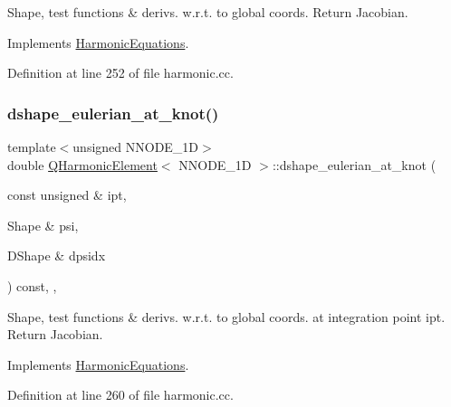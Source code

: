 Shape, test functions \& derivs. w.\+r.\+t. to global coords. Return Jacobian. 



Implements \hyperlink{classHarmonicEquations_ae013637e60841f46cf4c452ee3469163}{Harmonic\+Equations}.



Definition at line 252 of file harmonic.\+cc.

\mbox{\label{classQHarmonicElement_a6b11b5a42bd20c4e1d1e9840ba22a80a}} 
\subsubsection{\texorpdfstring{dshape\+\_\+eulerian\+\_\+at\+\_\+knot()}{dshape\_eulerian\_at\_knot()}}
{\footnotesize\ttfamily template$<$unsigned N\+N\+O\+D\+E\+\_\+1D$>$ \\
double \hyperlink{classQHarmonicElement}{Q\+Harmonic\+Element}$<$ N\+N\+O\+D\+E\+\_\+1D $>$\+::dshape\+\_\+eulerian\+\_\+at\+\_\+knot (\begin{DoxyParamCaption}\item[{const unsigned \&}]{ipt,  }\item[{Shape \&}]{psi,  }\item[{D\+Shape \&}]{dpsidx }\end{DoxyParamCaption}) const\hspace{0.3cm}{\ttfamily [inline]}, {\ttfamily [protected]}, {\ttfamily [virtual]}}



Shape, test functions \& derivs. w.\+r.\+t. to global coords. at integration point ipt. Return Jacobian. 



Implements \hyperlink{classHarmonicEquations_aaf04ba09dd948dcb0efb8e7e43da9736}{Harmonic\+Equations}.



Definition at line 260 of file harmonic.\+cc.

\mbox{\label{classQHarmonicElement_a8b38012f3d62ef419c359f5e545e5f85}} 
